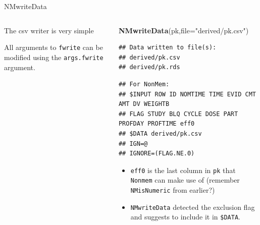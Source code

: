 \documentclass[
  8pt,
  ignorenonframetext,
  aspectratio=169]{beamer}
\newenvironment{Shaded}{\begin{snugshade}}{\end{snugshade}}
\newcommand{\DataTypeTok}[1]{\textcolor[rgb]{0.13,0.29,0.53}{#1}}
\newcommand{\KeywordTok}[1]{\textcolor[rgb]{0.13,0.29,0.53}{\textbf{#1}}}
\newcommand{\NormalTok}[1]{#1}
\newcommand{\StringTok}[1]{\textcolor[rgb]{0.31,0.60,0.02}{#1}}
\begin{document}
\begin{frame}[fragile]{NMwriteData}
\begin{columns}[T]
\begin{column}{0.48\textwidth}
\begin{block}{The csv writer is very simple}
\normalsize

All arguments to \texttt{fwrite} can be modified using the
\texttt{args.fwrite} argument.
\end{block}
\end{column}

\begin{column}{0.48\textwidth}
\footnotesize

\begin{Shaded}
\begin{Highlighting}[]
\KeywordTok{NMwriteData}\NormalTok{(pk,}\DataTypeTok{file=}\StringTok{"derived/pk.csv"}\NormalTok{)}
\end{Highlighting}
\end{Shaded}

\begin{verbatim}
## Data written to file(s):
## derived/pk.csv
## derived/pk.rds
\end{verbatim}

\begin{verbatim}
## For NonMem:
## $INPUT ROW ID NOMTIME TIME EVID CMT AMT DV WEIGHTB
## FLAG STUDY BLQ CYCLE DOSE PART PROFDAY PROFTIME eff0
## $DATA derived/pk.csv
## IGN=@
## IGNORE=(FLAG.NE.0)
\end{verbatim}

\normalsize

\vspace{12pt}

\begin{itemize}
\item
  \texttt{eff0} is the last column in \texttt{pk} that \texttt{Nonmem}
  can make use of (remember \texttt{NMisNumeric} from earlier?)
\item
  \texttt{NMwriteData} detected the exclusion flag and suggests to
  include it in \texttt{\$DATA}.
\end{itemize}
\end{column}
\end{columns}
\end{frame}
\end{document}
